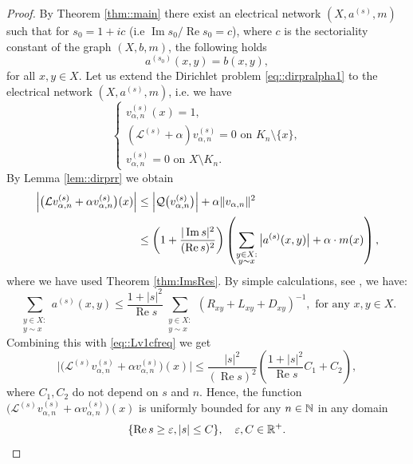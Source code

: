\documentclass[a4paper,11pt]{amsart}
\theoremstyle{definition}
\renewcommand{\a}{a}%
\renewcommand{\Re}{\operatorname{Re}}%
\renewcommand{\Im}{\operatorname{Im}}%
\renewcommand{\L}{\mathcal{L}}
\newcommand{\cfreq}{s}
\begin{document}
\begin{proof}
By Theorem \ref{thm::main} there exist an electrical network $(X,\a^{(\cfreq)}, m)$ such that  for $s_0=1+ic$ (i.e $\Im s_0/\Re s_0=c$), where $c$ is the sectoriality constant of the graph $(X,b,m)$, the following holds
$$
\a^{(\cfreq_0)}(x,y)=b(x,y),
$$
for all $x,y\in X$. Let us extend the Dirichlet problem \eqref{eq::dirpralpha1} to the electrical network $(X,\a^{(\cfreq)},m)$, i.e. we have 
\begin{equation*}
\begin{cases}
 v_{\alpha,n}^{(\cfreq)}(x)=1,\\
(\L^{(\cfreq)} +\alpha) v_{\alpha,n}^{(\cfreq)}=0\mbox{ on  }K_n\setminus\{x\},\\
 v_{\alpha,n}^{(\cfreq)}= 0 \mbox{ on  }X\setminus K_n.
\end{cases}
\end{equation*}
By Lemma \ref{lem::dirprr} we obtain
\begin{align}\label{eq::Lv1cfreq}
\Big|\big(\L   v_{\alpha,n}^{(\cfreq)}+\alpha  v_{\alpha,n}^{(\cfreq)}\big)(x)\Big|&\le \Big|\mathcal Q\big(v_{\alpha,n}^{(\cfreq)}\big)\Big|+\alpha \| v_{\alpha,n}\|^2\notag\\
&\le \left(1+\dfrac{|\Im\cfreq|^2}{(\Re {\cfreq})^2}\right)\left(\sum_{\substack{y\in X:\\y\sim x}}\big|\a^{(\cfreq)}(x,y)\big|+\alpha\cdot m(x)\right),
\end{align}
where we have used  Theorem \ref{thm:ImsRes}.
By simple calculations, see \cite[proof of Corollary 2]{Muranova3}, we have:
\begin{equation}\label{eq::sumas}
\sum_{\substack{y\in X:\\y\sim x}} \a^{(\cfreq)}(x,y)
\le
\frac{1 + |\cfreq|^2}{\Re \cfreq}
\sum_{\substack{y\in X:\\y\sim x}} 
\left(
R _{xy} + L _{xy} +D_{xy} 
\right)^{-1}, \mbox { for any }x,y\in X.
\end{equation}
Combining this with \eqref{eq::Lv1cfreq} we get
\begin{equation}\label{eq::unifombound}
\Big|\big(\L^{(\cfreq)}   v_{\alpha,n}^{(\cfreq)}+\alpha  v_{\alpha,n}^{(\cfreq)}\big)(x)\Big|\le \dfrac{|s|^2}{(\Re s)^2} \left(\frac{1 + |\cfreq|^2}{\Re \cfreq}C_1+C_2\right),
\end{equation}
where $C_1,C_2$ do not depend on $s$ and $n$. Hence, the function $\big(\L^{(\cfreq)}   v_{\alpha,n}^{(\cfreq)}+\alpha  v_{\alpha,n}^{(\cfreq)}\big)(x)$ is uniformly bounded for any $n\in \Bbb N$  in any domain
$$
\{\Re \cfreq \ge\varepsilon, |\cfreq|\le C\}, \quad \varepsilon, C\in \Bbb R^+.
$$
\end{proof}
\end{document}
